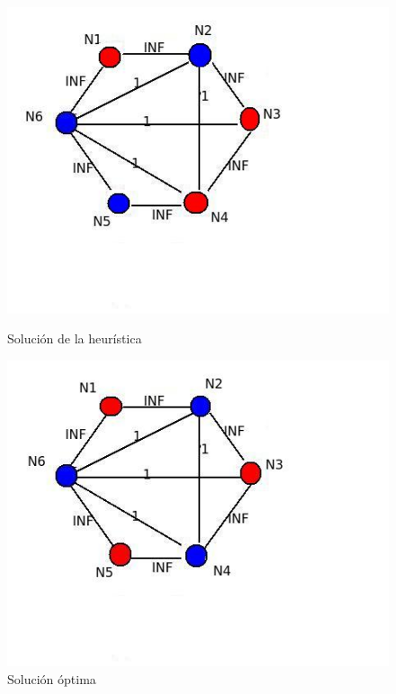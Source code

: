 \documentclass[11pt, a4paper, twoside]{article}
\begin{document}
\begin{enumerate}
		\begin{figure}[H]
			\begin{minipage}{.6\textwidth}
			\centering
			\includegraphics[width=.8\linewidth]{imagenes/ej3_11}
			\caption{Solución de la heurística}
			\end{minipage}
			\begin{minipage}{.6\textwidth}
			\includegraphics[width=.8\linewidth]{imagenes/ej3_12}
			\caption{Solución óptima}
			\end{minipage}
		\end{figure}
		

\end{enumerate}
\end{document}
